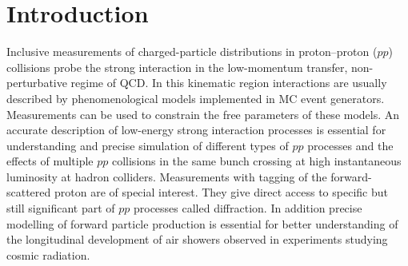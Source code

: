 \chapter{Introduction}\label{chapter:introduction}
Inclusive measurements of charged-particle distributions in proton–proton ($pp$) collisions probe the strong interaction in the low-momentum transfer, non-perturbative regime of \ac{QCD}. In this kinematic region interactions are usually described by phenomenological models implemented in \ac{MC} event generators. Measurements can be used to constrain the free parameters of these models. An accurate description of low-energy strong interaction processes is essential for understanding and precise simulation of different types of $pp$ processes and the effects of multiple $pp$ collisions in the same bunch crossing at high instantaneous luminosity at hadron colliders. Measurements with tagging of the forward-scattered proton are of special interest. They give direct access to specific but still significant part of $pp$ processes called diffraction. In addition precise modelling of forward particle production is essential for better understanding of the longitudinal development of air showers observed in experiments studying cosmic radiation.

